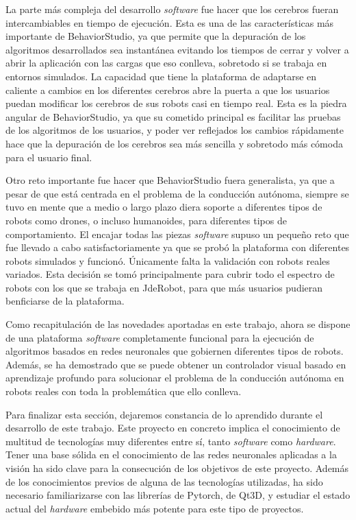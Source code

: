La parte más compleja del desarrollo \textit{software} fue hacer que los cerebros fueran intercambiables en tiempo de ejecución. Esta es una de las características más importante de BehaviorStudio, ya que permite que la depuración de los algoritmos desarrollados sea instantánea evitando los tiempos de cerrar y volver a abrir la aplicación con las cargas que eso conlleva, sobretodo si se trabaja en entornos simulados. La capacidad que tiene la plataforma de adaptarse en caliente a cambios en los diferentes cerebros abre la puerta a que los usuarios puedan modificar los cerebros de sus robots casi en tiempo real. Esta es la piedra angular de BehaviorStudio, ya que su cometido principal es facilitar las pruebas de los algoritmos de los usuarios, y poder ver reflejados los cambios rápidamente hace que la depuración de los cerebros sea más sencilla y sobretodo más cómoda para el usuario final.

Otro reto importante fue hacer que BehaviorStudio fuera generalista, ya que a pesar de que está centrada en el problema de la conducción autónoma, siempre se tuvo en mente que a medio o largo plazo diera soporte a diferentes tipos de robots como drones, o incluso humanoides, para diferentes tipos de comportamiento. El encajar todas las piezas \textit{software} supuso un pequeño reto que fue llevado a cabo satisfactoriamente ya que se probó la plataforma con diferentes robots simulados y funcionó. Únicamente falta la validación con robots reales variados. Esta decisión se tomó principalmente para cubrir todo el espectro de robots con los que se trabaja en JdeRobot, para que más usuarios pudieran benficiarse de la plataforma.

Como recapitulación de las novedades aportadas en este trabajo, ahora se dispone de una plataforma \textit{software} completamente funcional para la ejecución de algoritmos basados en redes neuronales que gobiernen diferentes tipos de robots. Además, se ha demostrado que se puede obtener un controlador visual basado en aprendizaje profundo para solucionar el problema de la conducción autónoma en robots reales con toda la problemática que ello conlleva.

Para finalizar esta sección, dejaremos constancia de lo aprendido durante el desarrollo de este trabajo. Este proyecto en concreto implica el conocimiento de multitud de tecnologías muy diferentes entre sí, tanto \textit{software} como \textit{hardware}. Tener una base sólida en el conocimiento de las redes neuronales aplicadas a la visión ha sido clave para la consecución de los objetivos de este proyecto. Además de los conocimientos previos de alguna de las tecnologías utilizadas, ha sido necesario familiarizarse con las librerías de Pytorch, de Qt3D, y estudiar el estado actual del \textit{hardware} embebido más potente para este tipo de proyectos.

